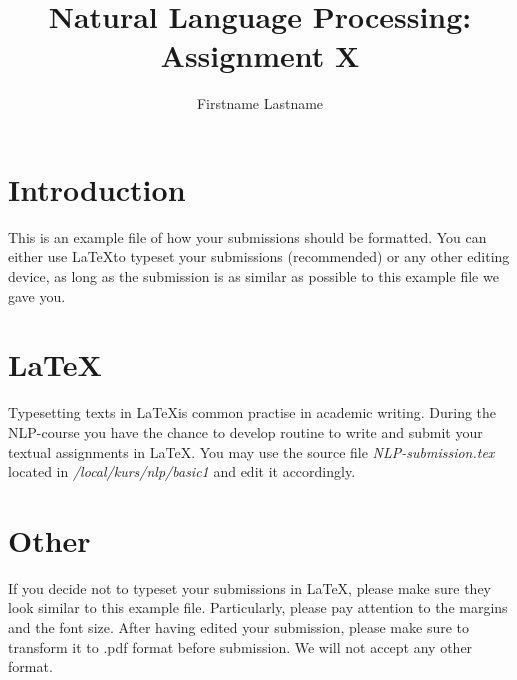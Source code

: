 \documentclass[11pt]{article} %
\title{{\LARGE Natural Language Processing: Assignment X}\\[1.5mm]} %
\author{Firstname Lastname} %
\date{} %
\begin{document}
\maketitle

\section{Introduction}
This is an example file of how your submissions should be formatted.
You can either use \LaTeX to typeset your submissions (recommended) or
any other editing device, as long as the submission is as similar as
possible to this example file we gave you.

\section{\LaTeX}
Typesetting texts in \LaTeX is common practise in academic
writing. During the NLP-course you have the chance to develop routine
to write and submit your textual assignments in \LaTeX. You may use
the source file \emph{NLP-submission.tex} located in
\emph{/local/kurs/nlp/basic1} and edit it accordingly.

\section{Other}
If you decide not to typeset your submissions in \LaTeX, please make
sure they look similar to this example file. Particularly, please pay
attention to the margins and the font size. After having edited your
submission, please make sure to transform it to .pdf format before
submission. We will not accept any other format.
\end{document}

